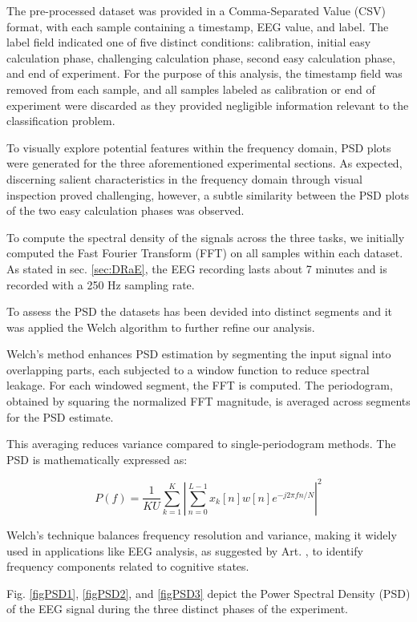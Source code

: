\documentclass[conference]{IEEEtran}
\begin{document}
The pre-processed dataset was provided in a Comma-Separated Value (CSV) format, with each sample containing a timestamp, EEG value, and label. The label field indicated one of five distinct conditions: calibration, initial easy calculation phase, challenging calculation phase, second easy calculation phase, and end of experiment. For the purpose of this analysis, the timestamp field was removed from each sample, and all samples labeled as calibration or end of experiment were discarded as they provided negligible information relevant to the classification problem. 

To visually explore potential features within the frequency domain, PSD plots were generated for the three aforementioned experimental sections. As expected, discerning salient characteristics in the frequency domain through visual inspection proved challenging, however, a subtle similarity between the PSD plots of the two easy calculation phases was observed.

To compute the spectral density of the signals across the three tasks, we initially computed the Fast Fourier Transform (FFT) on all samples within each dataset. As stated in  sec. \ref{sec:DRaE}, the EEG recording lasts about 7 minutes and is recorded with a 250 Hz sampling rate.

To assess the PSD the datasets has been devided into distinct segments and it was applied the Welch algorithm to further refine our analysis.

Welch's method enhances PSD estimation by segmenting the input signal into overlapping parts, each subjected to a window function to reduce spectral leakage. For each windowed segment, the FFT is computed. The periodogram, obtained by squaring the normalized FFT magnitude, is averaged across segments for the PSD estimate.

This averaging reduces variance compared to single-periodogram methods. The PSD is mathematically expressed as:

\[
P(f) = \frac{1}{KU} \sum_{k=1}^{K} \left| \sum_{n=0}^{L-1} x_k[n] w[n] e^{-j2\pi fn/N} \right|^2 
\]

Welch's technique balances frequency resolution and variance, making it widely used in applications like EEG analysis, as suggested by Art. \cite{Goker2023-tq}, to identify frequency components related to cognitive states.

Fig. \ref{figPSD1}, \ref{figPSD2}, and \ref{figPSD3} depict the Power Spectral Density (PSD) of the EEG signal during the three distinct phases of the experiment. 
\end{document}
